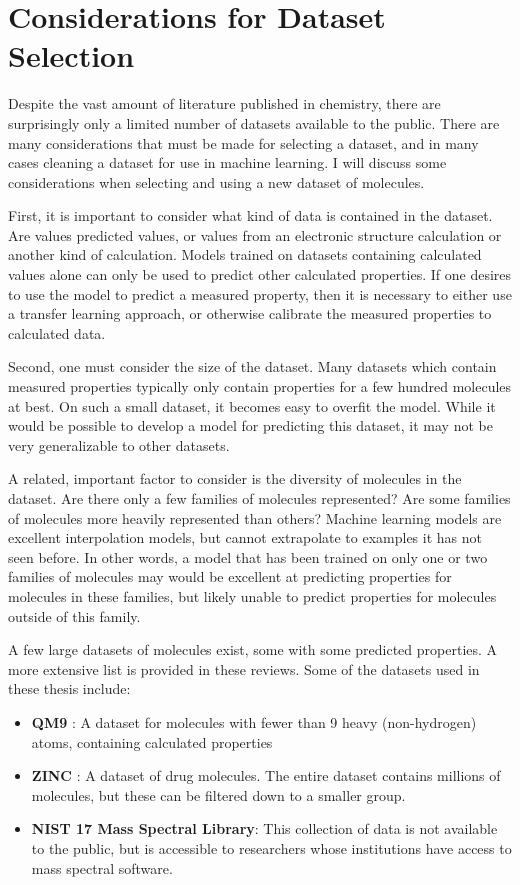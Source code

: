 \section{Considerations for Dataset Selection}\label{sec:cheminf}

Despite the vast amount of literature published in chemistry, there are surprisingly only a limited number of datasets available to the public. There are many considerations that must be made for selecting a dataset, and in many cases cleaning a dataset for use in machine learning. I will discuss some considerations when selecting and using a new dataset of molecules.

First, it is important to consider what kind of data is contained in the dataset. Are values predicted values, or values from an electronic structure calculation or another kind of calculation. Models trained on datasets containing calculated values alone can only be used to predict other calculated properties. If one desires to use the model to predict a measured property, then it is necessary to either use a transfer learning approach, or otherwise calibrate the measured properties to calculated data.

Second, one must consider the size of the dataset. Many datasets which contain measured properties typically only contain properties for a few hundred molecules at best. On such a small dataset, it becomes easy to overfit the model. While it would be possible to develop a model for predicting this dataset, it may not be very generalizable to other datasets.

A related, important factor to consider is the diversity of molecules in the dataset. Are there only a few families of molecules represented? Are some families of molecules more heavily represented than others? Machine learning models are excellent interpolation models, but cannot extrapolate to examples it has not seen before. In other words, a model that has been trained on only one or two families of molecules may would be excellent at predicting properties for molecules in these families, but likely unable to predict properties for molecules outside of this family.

A few large datasets of molecules exist, some with some predicted properties. A more extensive list is provided in these reviews. Some of the datasets used in these thesis include:
\begin{itemize}
\item \textbf{QM9} : A dataset for molecules with fewer than 9 heavy (non-hydrogen) atoms, containing calculated properties
\item \textbf{ZINC} : A dataset of drug molecules. The entire dataset contains millions of molecules, but these can be filtered down to a smaller group.
\item \textbf{NIST 17 Mass Spectral Library}: This collection of data is not available to the public, but is accessible to researchers whose institutions have access to mass spectral software.
\end{itemize}

